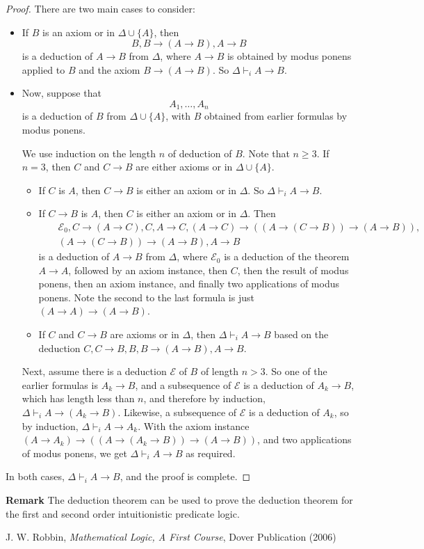 \documentclass[12pt]{article}
\begin{document}
\begin{proof}  There are two main cases to consider:
\begin{itemize}
\item
If $B$ is an axiom or in $\Delta\cup \lbrace A\rbrace$, then $$B, B\to (A\to B), A\to B$$ is a deduction of $A\to B$ from $\Delta$, where $A\to B$ is obtained by modus ponens applied to $B$ and the axiom $B\to (A\to B)$.  So $\Delta \vdash_i A\to B$.
\item
Now, suppose that $$A_1,\ldots, A_n$$ is a deduction of $B$ from $\Delta\cup \lbrace A \rbrace$, with $B$ obtained from earlier formulas by modus ponens.

We use induction on the length $n$ of deduction of $B$.  Note that $n\ge 3$.  If $n=3$, then $C$ and $C\to B$ are either axioms or in $\Delta\cup \lbrace A\rbrace$.  
\begin{itemize}
\item If $C$ is $A$, then $C\to B$ is either an axiom or in $\Delta$.  So $\Delta \vdash_i A\to B$.
\item If $C\to B$ is $A$, then $C$ is either an axiom or in $\Delta$.  Then 
\begin{eqnarray*}
&&\mathcal{E}_0, C\to (A\to C), C, A\to C, (A\to C)\to ((A\to (C\to B))\to (A\to B)), \\
&&(A\to (C\to B))\to (A\to B), A\to B
\end{eqnarray*}
is a deduction of $A\to B$ from $\Delta$, where $\mathcal{E}_0$ is a deduction of the theorem $A\to A$, followed by an axiom instance, then $C$, then the result of modus ponens, then an axiom instance, and finally two applications of modus ponens.  Note the second to the last formula is just $(A\to A)\to (A\to B)$.
\item If $C$ and $C\to B$ are axioms or in $\Delta$, then $\Delta \vdash_i A\to B$ based on the deduction $C, C\to B, B, B\to (A\to B), A\to B$.
\end{itemize}

Next, assume there is a deduction $\mathcal{E}$ of $B$ of length $n>3$.  So one of the earlier formulas is $A_k \to B$, and a subsequence of $\mathcal{E}$ is a deduction of $A_k \to B$, which has length less than $n$, and therefore by induction, $\Delta \vdash_i A \to (A_k \to B)$.  Likewise, a subsequence of $\mathcal{E}$ is a deduction of $A_k$, so by induction, $\Delta \vdash_i A \to A_k$.  With the axiom instance $(A\to A_k)\to ((A\to (A_k\to B))\to (A\to B))$, and two applications of modus ponens, we get $\Delta\vdash_i A\to B$ as required.
\end{itemize}
In both cases, $\Delta \vdash_i A\to B$, and the proof is complete.
\end{proof}

\textbf{Remark}  The deduction theorem can be used to prove the deduction theorem for the first and second order intuitionistic predicate logic.

\begin{thebibliography}{7}
 J. W. Robbin, {\it Mathematical Logic, A First Course}, Dover Publication (2006)
\end{thebibliography}

\end{document}
